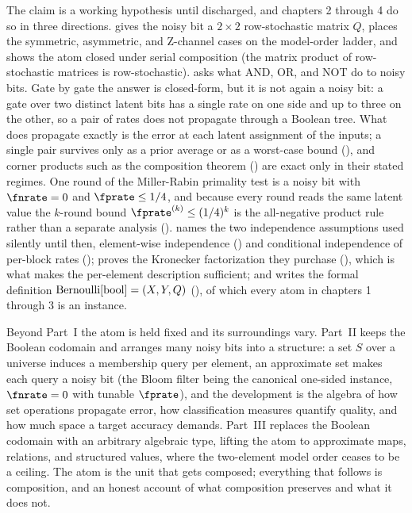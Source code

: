 The claim is a working hypothesis until discharged, and chapters 2 through 4 do
so in three directions.  gives the noisy bit a
$2 \times 2$ row-stochastic matrix $Q$, places the symmetric, asymmetric, and
Z-channel cases on the model-order ladder, and shows the atom closed under
serial composition (the matrix product of row-stochastic matrices is
row-stochastic).  asks what AND, OR, and NOT do to
noisy bits. Gate by gate the answer is closed-form, but it is not again a noisy
bit: a gate over two distinct latent bits has a single rate on one side and up
to three on the other, so a pair of rates does not propagate through a Boolean
tree. What does propagate exactly is the error at each latent assignment of the
inputs; a single pair survives only as a prior average or as a worst-case bound
(), and corner products such as the composition
theorem () are exact only in their stated
regimes. One round of the Miller-Rabin primality test
is a noisy bit with $\fnrate = 0$ and $\fprate \le 1/4$, and because every
round reads the same latent value the $k$-round bound $\fprate^{(k)} \le
(1/4)^k$ is the all-negative product rule rather than a separate analysis
(). 
names the two independence assumptions used silently until then, element-wise
independence () and conditional independence of per-block
rates (); proves the Kronecker factorization they purchase
(), which is what makes the per-element description
sufficient; and writes the formal definition $\mathrm{Bernoulli}[\mathrm{bool}] = (X, Y,
Q)$ (), of which every atom in chapters 1 through 3
is an instance.

Beyond Part~I the atom is held fixed and its surroundings vary. Part~II keeps
the Boolean codomain and arranges many noisy bits into a structure: a set $S$
over a universe induces a membership query per element, an approximate set
makes each query a noisy bit (the Bloom filter being the canonical one-sided
instance, $\fnrate = 0$ with tunable $\fprate$), and the development is the
algebra of how set operations propagate error, how classification measures
quantify quality, and how much space a target accuracy demands. Part~III
replaces the Boolean codomain with an arbitrary algebraic type, lifting the
atom to approximate maps, relations, and structured values, where the
two-element model order ceases to be a ceiling. The atom is the unit that gets
composed; everything that follows is composition, and an honest account of what
composition preserves and what it does not.
